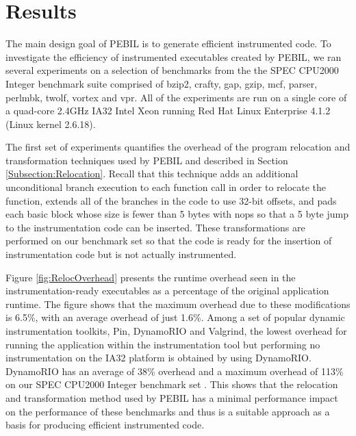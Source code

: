 \section{Results}
\label{sec:Results}

The main design goal of PEBIL is to generate efficient instrumented code. 
To investigate the efficiency of instrumented executables created by PEBIL, we ran several experiments 
on a selection of benchmarks from the the SPEC CPU2000 Integer benchmark suite comprised of
bzip2, crafty, gap, gzip, mcf, parser, perlmbk, twolf, vortex and vpr. All of the experiments are run on a
single core of a quad-core 2.4GHz IA32 Intel Xeon running Red Hat Linux Enterprise 4.1.2 (Linux kernel 2.6.18). 

The first set of experiments quantifies the overhead of the program relocation and 
transformation techniques used by PEBIL and
described in Section \ref{Subsection:Relocation}. 
Recall that this technique adds an additional unconditional
branch execution to each function call in order to relocate the function, extends all of the branches in the code
to use 32-bit offsets, and pads each basic block whose size is fewer than 5 bytes with nops so that a
5 byte jump to the instrumentation code can be inserted. These transformations are performed on our benchmark set 
so that the code is ready for the insertion of instrumentation code but is not actually instrumented. 

Figure \ref{fig:RelocOverhead} presents
the runtime overhead seen in the instrumentation-ready executables as a percentage of the original application runtime.
The figure shows that the maximum overhead due to these modifications is 6.5\%, with an
average overhead of just 1.6\%. Among a set of popular dynamic instrumentation toolkits,
Pin, DynamoRIO and Valgrind, the lowest overhead for running the application within the instrumentation
tool but performing no instrumentation
on the IA32 platform is obtained by using DynamoRIO. DynamoRIO has an average of 38\% overhead and a maximum overhead of 113\% on
our SPEC CPU2000 Integer benchmark set \cite{luk2005pin}. This shows that the 
relocation and transformation method used by PEBIL has a minimal
performance impact on the performance of these benchmarks and thus is a suitable approach as a basis for
producing efficient instrumented code.


